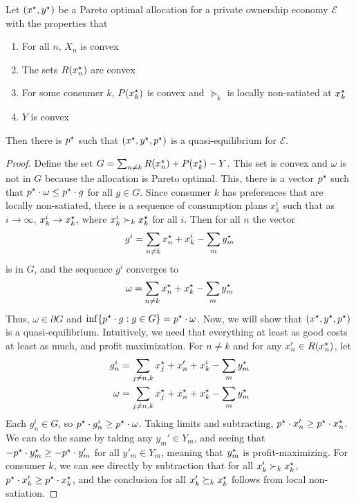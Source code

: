 \documentclass[10pt]{article}
\begin{document}
\begin{theorem}\label{thm:second_welfare_theorem}
	 Let $(x^\star,y^\star)$ be a Pareto optimal allocation for a private ownership economy $\mathcal{E}$ with the properties that
	\begin{enumerate}
		\item For all $n$, $X_n$ is convex
		\item The sets $R(x_n^\star)$ are convex
		\item For some consumer $k$, $P(x_k^\star)$ is convex and $\succeq_k$ is locally non-satiated at $x^\star_k$
		\item $Y$ is convex
	\end{enumerate}
	Then there is $p^\star$ such that $(x^\star,y^\star,p^\star)$ is a quasi-equilibrium for $\mathcal{E}$.
\end{theorem}
\begin{proof}
	Define the set $G = \sum_{n\ne k} R(x_n^\star) + P(x_k^\star) - Y$. This set is convex and $\omega$ is not in $G$ because the allocation is Pareto optimal. This, there is a vector $p^\star$ such that $p^\star \cdot \omega \le p^\star \cdot g$ for all $g \in G$. Since consumer $k$ has preferences that are locally non-satiated, there is a sequence of consumption plans $x_k^i$ such that as $i \to \infty$, $x_k^i \to x_k^\star$, where $x_k^i \succ_k x_k^\star$ for all $i$. Then for all $n$ the vector \[g^i = \sum_{n\ne k} x_n^\star + x_k^i - \sum_m y_m^\star\]is in $G$, and the sequence $g^i$ converges to\[\omega = \sum_{n\ne k} x_n^\star + x_k^\star - \sum_m y_m^\star\]Thus, $\omega \in \partial G$ and $\inf\{p^\star \cdot g : g \in G\} = p^\star \cdot \omega$. Now, we will show that $(x^\star,y^\star,p^\star)$ is a quasi-equilibrium. Intuitively, we need that everything at least as good costs at least as much, and profit maximization. For $n \ne k$ and for any $x_n' \in R(x_n^\star)$, let \begin{align*} g_n^i &= \sum_{j\ne n,k} x_j^\star + x_n' + x_k^i - \sum_m y_m^\star \\\omega &= \sum_{j\ne n,k} x_j^\star + x_n^\star + x_k^\star - \sum_m y_m^\star\end{align*}Each $g^i_n \in G$, so $p^\star \cdot g^i_n \ge p^\star \cdot \omega$. Taking limits and subtracting, $p^\star \cdot x_n' \ge p^\star \cdot x_n^\star$. We can do the same by taking any $y_m' \in Y_m$, and seeing that $-p^\star \cdot y_m^\star \ge -p^\star \cdot y_m'$ for all $y'_m \in Y_m$, meaning that $y_m^\star$ is profit-maximizing. For consumer $k$, we can see directly by subtraction that for all $x'_k \succ_k x_k^\star$, $p^\star \cdot x_k' \ge p^\star \cdot x_k^\star$, and the conclusion for all $x'_k \succeq_k x_k^\star$ follows from local non-satiation.
\end{proof}
\end{document}
